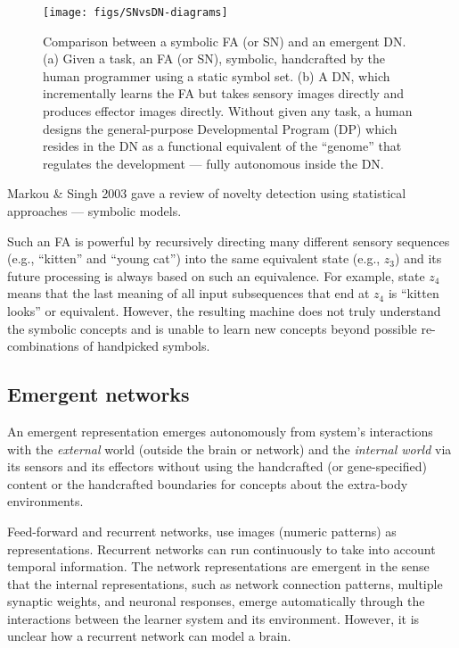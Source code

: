 \documentclass[conference]{IEEEtran}
\begin{document}
\begin{figure}[tb]
     \centering
      \texttt{[image: figs/SNvsDN-diagrams]}
\caption{\protect\small  Comparison between a symbolic FA (or SN) and an emergent DN.
(a) Given a task, an FA (or SN), symbolic, handcrafted by the human programmer using a static symbol set.  
(b)  A DN, which incrementally learns the FA but takes sensory images directly and produces effector images directly.  Without given any task, a human designs the general-purpose Developmental Program (DP) which 
resides in the DN as a functional equivalent of the ``genome'' that regulates the development --- fully autonomous inside the DN.}
 \label{FG:SNvsDN-diagrams}
\end{figure}

Markou \& Singh 2003 \cite{Markou03s} gave a review of novelty detection using statistical approaches --- symbolic models. 

Such an FA is powerful by recursively directing many different sensory sequences (e.g., ``kitten'' and ``young cat'') into the same equivalent state (e.g., $z_3$) and its future processing is always based on such an equivalence.  For example, state $z_4$  means that the last meaning of all input subsequences that end at 
$z_4$ is ``kitten looks'' or equivalent.   However, the resulting machine does not truly understand the symbolic 
concepts and is unable to learn new concepts beyond possible re-combinations of handpicked symbols.   

\subsection{Emergent networks}

An emergent representation emerges autonomously from system's  interactions with the {\em external} world (outside the brain or network) and
the {\em internal world} via its sensors and
its effectors without using the handcrafted (or gene-specified) content or the handcrafted 
boundaries for concepts about the extra-body environments.

Feed-forward \cite{Serre07,Rogers08} and recurrent \cite{Hinton06,Yamashita08} networks, use 
images (numeric patterns) as representations.    Recurrent networks can run continuously to take into account temporal information.  The network representations are emergent in the sense that the internal
representations, such as network connection patterns, multiple synaptic weights, and neuronal responses, emerge automatically 
through the interactions between the learner system and its environment.   
However, it is unclear how a recurrent network can model a brain.  
\end{document}
